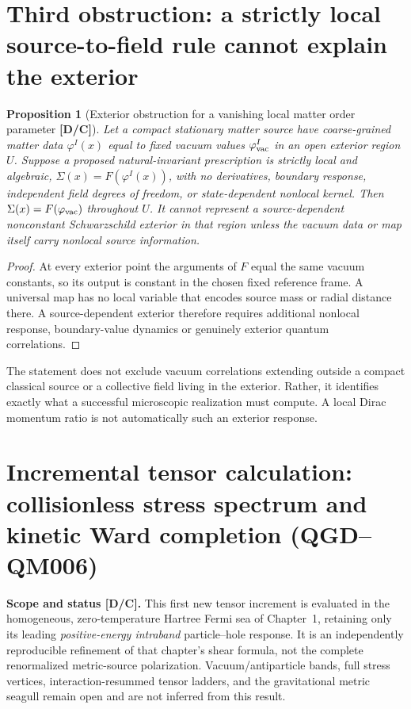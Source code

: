 \documentclass[11pt,a4paper]{article}
\newtheorem{proposition}{Proposition}[section]\newtheorem{lemma}[proposition]{Lemma}\newtheorem{definition}[proposition]{Definition}\newtheorem{remark}[proposition]{Remark}
\begin{document}
\section{Third obstruction: a strictly local source-to-field rule cannot explain the exterior}
\begin{proposition}[Exterior obstruction for a vanishing local matter order parameter \textbf{[D/C]}]\label{prop:exterior}
Let a compact stationary matter source have coarse-grained matter data $\varphi^I(x)$ equal to fixed vacuum values $\varphi^I_{\rm vac}$ in an open exterior region $U$. Suppose a proposed natural-invariant prescription is strictly local and algebraic, $\Sigma(x)=F(\varphi^I(x))$, with no derivatives, boundary response, independent field degrees of freedom, or state-dependent nonlocal kernel. Then $\Sigma(x)=F(\varphi_{\rm vac})$ throughout $U$. It cannot represent a \emph{source-dependent} nonconstant Schwarzschild exterior in that region unless the vacuum data or map itself carry nonlocal source information.
\end{proposition}
\begin{proof}
At every exterior point the arguments of $F$ equal the same vacuum constants, so its output is constant in the chosen fixed reference frame. A universal map has no local variable that encodes source mass or radial distance there. A source-dependent exterior therefore requires additional nonlocal response, boundary-value dynamics or genuinely exterior quantum correlations.
\end{proof}
The statement does not exclude vacuum correlations extending outside a compact classical source or a collective field living in the exterior. Rather, it identifies exactly what a successful microscopic realization must compute. A local Dirac momentum ratio is not automatically such an exterior response.


\section{Incremental tensor calculation: collisionless stress spectrum and kinetic Ward completion (QGD--QM006)}\label{sec:qm006-tensor}
\noindent\textbf{Scope and status [D/C].} This first new tensor increment is evaluated in the homogeneous, zero-temperature Hartree Fermi sea of Chapter~1, retaining only its leading \emph{positive-energy intraband} particle--hole response. It is an independently reproducible refinement of that chapter's shear formula, not the complete renormalized metric-source polarization. Vacuum/antiparticle bands, full stress vertices, interaction-resummed tensor ladders, and the gravitational metric seagull remain open and are not inferred from this result.
\end{document}
